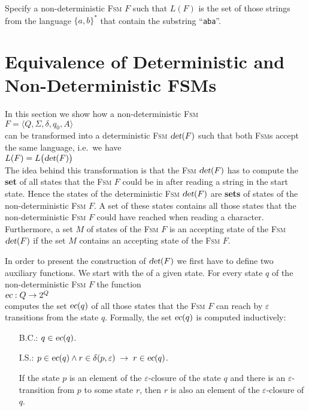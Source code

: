 \exerciseEng
Specify a non-deterministic \textsc{Fsm} $F$ such that $L(F)$ is the set of those
strings from the language  $\{a,b\}^*$ that contain the substring ``\texttt{aba}''. \eox

\section{Equivalence of  Deterministic and Non-Deterministic  FSMs}
In this section we show how a non-deterministic \textsc{Fsm} 
\\[0.2cm]
\hspace*{1.3cm}
$F = \langle Q, \Sigma, \delta, q_0, A \rangle$ 
\\[0.2cm]
can be transformed into a deterministic \textsc{Fsm} $\textsl{det}(F)$ such that both \textsc{Fsm}s accept the
same language, i.e.~we have
\\[0.2cm]
\hspace*{1.3cm}
$L(F) = L\bigl(\textsl{det}(F)\bigr)$
\\[0.2cm]
The idea behind this transformation is that the \textsc{Fsm} $\textsl{det}(F)$ has to compute the \textbf{set} of all states that the
\textsc{Fsm} $F$ could be in after reading a string in the start state.   Hence the states of the deterministic
\textsc{Fsm} $\textsl{det}(F)$ are  \textbf{sets} of states of the non-deterministic \textsc{Fsm} $F$.  A set
of these states contains all those  
states that the non-deterministic \textsc{Fsm} $F$ could have reached when reading a character.
Furthermore, a set $M$ of states of the \textsc{Fsm} $F$ is an accepting state of the \textsc{Fsm}
$\textsl{det}(F)$ if the set $M$ contains an accepting state of the \textsc{Fsm} $F$.

In order to present the construction of $\textsl{det}(F)$ we first have to define two auxiliary functions.
We start with the   of a given state.  For every state
$q$ of the non-deterministic \textsc{Fsm} $F$ the function
\\[0.2cm]
\hspace*{1.3cm}
$\textsl{ec}: Q \rightarrow 2^Q$
\\[0.2cm]
computes the set $\textsl{ec}(q)$ of all those states that the \textsc{Fsm} $F$ can reach by $\varepsilon$
transitions from the state $q$.   Formally, the set $\textsl{ec}(q)$ is computed inductively:
\begin{enumerate}
\item[B.C.:] $q \in \textsl{ec}(q)$.
\item[I.S.:] $p \in \textsl{ec}(q) \wedge r \in \delta(p, \varepsilon) \;\rightarrow\; r \in \textsl{ec}(q)$.
 
             If the state $p$ is an element of the $\varepsilon$-closure of the state $q$ and there is an
             $\varepsilon$-transition from $p$ to some state $r$, then $r$ is also an element
             of the $\varepsilon$-closure of $q$. 
\end{enumerate}


